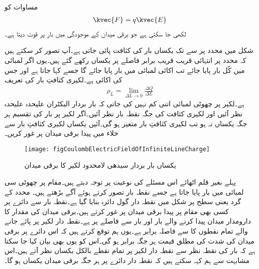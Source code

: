 مساوات  کو
\begin{align}
\kvec{F}=q \kvec{E}
\end{align}
لکھی جا سکتی ہے جو برقی میدان  کے موجودگی میں بار  پر قوت  دیتا ہے۔


شکل  میں  محدد پر  سے  تک یکساں بار کی کثافت پائی جاتی ہے۔آپ تصور کر سکتے ہیں کہ  محدد پر انتہائی قریب قریب برابر فاصلے پر یکساں  رکھے گئے ہیں۔یوں اگر  لمبائی میں کُل  بار پایا جائے تب اکائی لمبائی میں  بار پایا جائے گا جسے    کہا جاتا ہے اور جس کی اکائی  ہے۔لکیری کثافتِ بار کی تعریف
\begin{align}
\rho_L=\lim_{\Delta L \to 0}\frac{\Delta Q}{\Delta L}
\end{align}
ہے۔لکیر پر چھوٹی لمبائی  اتنی کم نہیں کی جاتی کہ بار بردار الیکٹران علیحدہ علیحدہ نظر آئیں اور لکیری کثافت کی جگہ نقطہ بار نظر آئیں۔اگر لکیر پر بار کی تقسیم ہر جگہ یکساں نہ ہو تب لکیری کثافتِ بار متغیر ہو گی۔آئیں یکساں لکیری کثافتِ بار سے خلاء میں پیدا برقی میدان پر غور کریں۔ 
 \begin{figure}
\centering
\texttt{[image: figCoulombElectricFieldOfInfiniteLineCharge]}
\caption{یکساں بار بردار سیدھی لامحدود لکیر  کا برقی میدان}
\label{شکل_کولمب_لامحدود_لکیر_پر_بار_کا_میدان}
\end{figure}

پہلے بغیر قلم اٹھائے اس مسئلے کی نوعیت پر توجہ دیتے ہیں۔مقام  پر  چھوٹی سی لمبائی  میں  بار پایا جاتا ہے جسے نقطہ بار تصور کرتے ہوئے آگے بڑھتے ہیں۔ محدد کے گرد  یعنی   سطح پر  شکل  میں نقطہ دار گول دائرہ بنایا گیا ہے۔نقطہ بار  سے دائرے پر کسی بھی مقام پر پیدا برقی میدان پر غور کرتے ہیں۔برقی میدان کی مقدار کا دارومدار میدان پیدا کرنے والے بار اور بار سے فاصلے پر ہے۔نقطہ دار لکیر پر پائے جانے والے تمام نقطوں کا  سے فاصلہ برابر ہے۔یوں ہم توقع کرتے ہیں کہ اس دائرے پر برقی میدان کی شدت کی مطلق قیمت ہر جگہ برابر ہو گی۔اس کو یوں بھی بیان کیا جا سکتا ہے کہ بار کی نقطہ نظر سے نقطہ دار لکیر پر تمام نقطے بالکل یکساں نظر آتے ہیں۔اس مشابہت سے ہم کہہ سکتے ہیں کہ نقطہ دار دائرے پر ہر جگہ برقی میدان یکساں ہو گا۔ 

